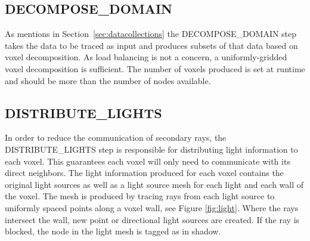 \subsection{DECOMPOSE\_DOMAIN}

As mentions in Section~\ref{sec:datacollections} the DECOMPOSE\_DOMAIN
step takes the data to be traced as input and produces subsets of that
data based on voxel decomposition. As load balancing is not a concern,
a uniformly-gridded voxel decomposition is sufficient. The number of
voxels produced is set at runtime and should be more than the number
of nodes available.

\subsection{DISTRIBUTE\_LIGHTS}

In order to reduce the communication of secondary rays,
the DISTRIBUTE\_LIGHTS step is responsible for distributing light
information to each voxel. This guarantees each voxel will only need
to communicate with its direct neighbors. The light information
produced for each voxel contains the original light sources as well as
a light source mesh for each light and each wall of the voxel. The
mesh is produced by tracing rays from each light source to uniformly
spaced points along a voxel wall, see Figure \ref{fig:light}. Where
the rays intersect the wall, new point or directional light sources
are created. If the ray is blocked, the node in the light mesh is
tagged as in shadow.

